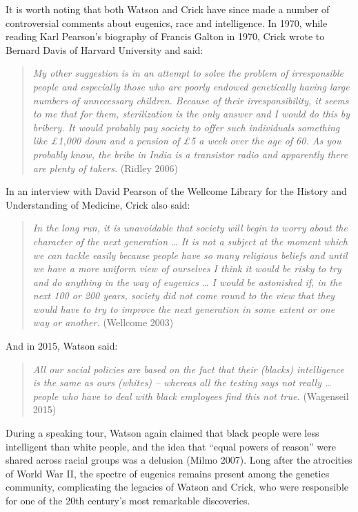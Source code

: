 \documentclass[
]{book}
\begin{document}
It is worth noting that both Watson and Crick have since made a number of controversial comments about eugenics, race and intelligence. In 1970, while reading Karl Pearson's biography of Francis Galton in 1970, Crick wrote to Bernard Davis of Harvard University and said:

\begin{quote}
\emph{My other suggestion is in an attempt to solve the problem of irresponsible people and especially those who are poorly endowed genetically having large numbers of unnecessary children. Because of their irresponsibility, it seems to me that for them, sterilization is the only answer and I would do this by bribery. It would probably pay society to offer such individuals something like £1,000 down and a pension of £5 a week over the age of 60. As you probably know, the bribe in India is a transistor radio and apparently there are plenty of takers.} (Ridley 2006)
\end{quote}

In an interview with David Pearson of the Wellcome Library for the History and Understanding of Medicine, Crick also said:

\begin{quote}
\emph{In the long run, it is unavoidable that society will begin to worry about the character of the next generation \ldots{} It is not a subject at the moment which we can tackle easily because people have so many religious beliefs and until we have a more uniform view of ourselves I think it would be risky to try and do anything in the way of eugenics \ldots{} I would be astonished if, in the next 100 or 200 years, society did not come round to the view that they would have to try to improve the next generation in some extent or one way or another.} (Wellcome 2003)
\end{quote}

And in 2015, Watson said:

\begin{quote}
\emph{All our social policies are based on the fact that their (blacks) intelligence is the same as ours (whites) -- whereas all the testing says not really \ldots{} people who have to deal with black employees find this not true.} (Wagenseil 2015)
\end{quote}

During a speaking tour, Watson again claimed that black people were less intelligent than white people, and the idea that ``equal powers of reason'' were shared across racial groups was a delusion (Milmo 2007). Long after the atrocities of World War II, the spectre of eugenics remains present among the genetics community, complicating the legacies of Watson and Crick, who were responsible for one of the 20th century's most remarkable discoveries.
\end{document}
